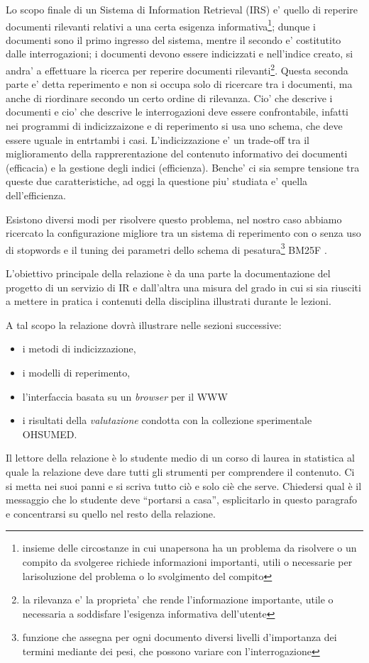 \documentclass[runningheads]{llncs}
\begin{document}
Lo scopo finale di un Sistema di Information Retrieval (IRS) e' quello di reperire documenti rilevanti relativi a una certa esigenza informativa\footnote{insieme delle circostanze in cui unapersona ha un problema da risolvere o un compito da svolgeree richiede informazioni importanti, utili o necessarie per larisoluzione del problema o lo svolgimento del compito}; dunque i documenti sono il primo ingresso del sistema, mentre il secondo e' costitutito dalle interrogazioni; i documenti devono essere indicizzati e nell'indice creato, si andra' a effettuare la ricerca per reperire documenti rilevanti\footnote{la rilevanza e' la proprieta' che rende l'informazione importante, utile o necessaria a soddisfare l'esigenza informativa dell'utente}. Questa seconda parte e' detta reperimento e non si occupa solo di ricercare tra i documenti, ma anche di riordinare secondo un certo ordine di rilevanza. Cio' che descrive i documenti e cio' che descrive le interrogazioni deve essere confrontabile, infatti nei programmi di indicizzaizone e di reperimento si usa uno schema, che deve essere uguale in entrtambi i casi.
L'indicizzazione e' un trade-off tra il  miglioramento della rapprerentazione del contenuto informativo dei documenti (efficacia) e la gestione degli indici (efficienza). Benche' ci sia sempre tensione tra queste due caratteristiche, ad oggi la questione piu' studiata e' quella dell'efficienza.

Esistono diversi modi per risolvere questo problema, nel nostro caso abbiamo ricercato la configurazione migliore tra un sistema di
reperimento con o senza uso di stopwords e il tuning dei parametri dello schema di pesatura\footnote{funzione che assegna per ogni documento diversi livelli d’importanza dei termini mediante dei pesi, che possono variare con l’interrogazione} BM25F \cite{WBC}.




L'obiettivo principale della relazione \`e da una parte la
documentazione del progetto di un servizio di {IR} e dall'altra una
misura del grado in cui si sia riusciti a mettere in pratica i
contenuti della disciplina illustrati durante le lezioni.

A tal scopo la relazione dovr\`a illustrare nelle sezioni successive:
\begin{itemize}
\item i metodi di indicizzazione,
\item i modelli di reperimento,
\item l'interfaccia basata su un \textit{browser} per il {WWW}
\item i risultati della \emph{valutazione} condotta con la collezione
  sperimentale OHSUMED.
\end{itemize}
Il lettore della relazione \`e lo studente medio di un corso di laurea
in statistica al quale la relazione deve dare tutti gli strumenti per
comprendere il contenuto.  Ci si metta nei suoi panni e si scriva
tutto ci\`o e solo ci\`e che serve.  Chiedersi qual \`e il messaggio
che lo studente deve ``portarsi a casa'', esplicitarlo in questo
paragrafo e concentrarsi su quello nel resto della relazione.
\end{document}
